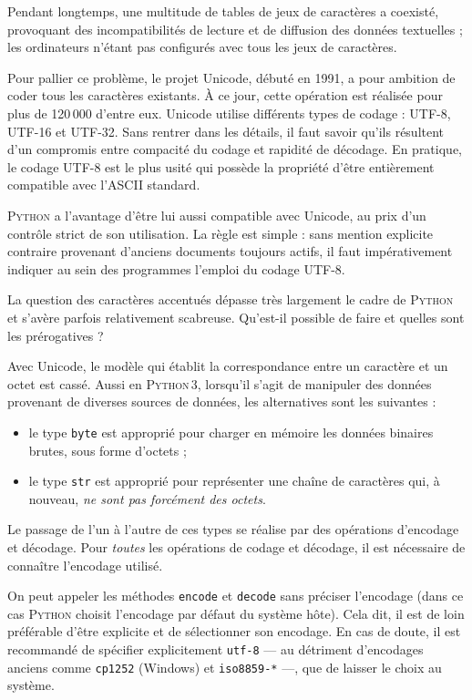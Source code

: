 Pendant longtemps, une multitude de tables de jeux de caractères a coexisté, provoquant des incompatibilités de lecture et de diffusion des données textuelles ; les ordinateurs n'étant pas configurés avec tous les jeux de caractères.

Pour pallier ce problème, le projet Unicode, débuté en 1991, a pour ambition de coder tous les caractères existants. À ce jour, cette opération est réalisée pour plus de 120\,000 d'entre eux. Unicode utilise différents types de codage : UTF-8, UTF-16 et UTF-32. Sans rentrer dans les détails, il faut savoir qu'ils résultent d'un compromis entre compacité du codage et rapidité de décodage. En pratique, le codage UTF-8 est le plus usité qui possède la propriété d'être entièrement compatible avec l'ASCII standard.

\begin{linewidthnote}
\textsc{Python} a l'avantage d'être lui aussi compatible avec Unicode, au prix d'un contrôle strict de son utilisation. La règle est simple :  sans mention explicite contraire provenant d'anciens documents toujours actifs, il faut impérativement indiquer au sein des programmes l'emploi du codage UTF-8. 
\end{linewidthnote}



La question des caractères accentués dépasse très largement le cadre de \textsc{Python} et s'avère parfois relativement scabreuse. Qu'est-il possible de faire et quelles sont les prérogatives ?

Avec Unicode, le modèle qui établit la correspondance entre un caractère et un octet est cassé. Aussi en \textsc{Python\,3}, lorsqu'il s'agit de manipuler des données provenant de diverses sources de données, les alternatives sont les suivantes :
\begin{itemize}
	\item le type \texttt{byte} est approprié pour charger en mémoire les données binaires brutes, sous forme d'octets ;
	\item le type \texttt{str} est approprié pour représenter une chaîne de caractères qui, à nouveau, \emph{ne sont pas forcément des octets}.
\end{itemize}
Le passage de l'un à l'autre de ces types se réalise par des opérations d'encodage et décodage. Pour \emph{toutes} les opérations de codage et décodage, il est nécessaire de connaître l'encodage utilisé.

On peut appeler les méthodes \texttt{encode} et \texttt{decode} sans préciser l'encodage (dans ce cas \textsc{Python} choisit l'encodage par défaut du système hôte). Cela dit, il est de loin préférable d'être explicite et de sélectionner son encodage. En cas de doute, il est recommandé de spécifier explicitement \texttt{utf-8} --- au détriment d'encodages anciens comme \texttt{cp1252} (Windows) et \texttt{iso8859-*} ---, que de laisser le choix au système.

